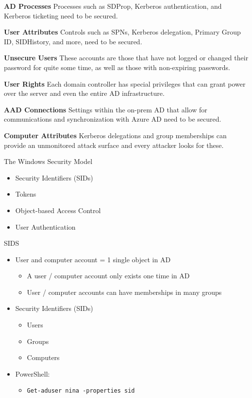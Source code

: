 \textbf{AD Processes}
Processes such as SDProp, Kerberos authentication, and Kerberos ticketing need to be secured.

\textbf{User Attributes}
Controls such as SPNs, Kerberos delegation, Primary Group ID, SIDHistory, and more, need to be secured.

\textbf{Unsecure Users}
These accounts are those that have not logged or changed their password for quite some time, as well as those with non-expiring passwords.

\textbf{User Rights}
Each domain controller has special privileges that can grant power over the server and even the entire AD infrastructure.

\textbf{AAD Connections}
Settings within the on-prem AD that allow for communications and synchronization with Azure AD need to be secured.

\textbf{Computer Attributes}
Kerberos delegations and group memberships can provide an unmonitored attack surface and every attacker looks for these.

The Windows Security Model

\begin{itemize}
    \item Security Identifiers (SIDs)
    \item Tokens
    \item Object-based Access Control
    \item User Authentication
\end{itemize}

SIDS
\begin{itemize}
    \item User and computer account = 1 single object in AD
    \begin{itemize}
        \item A user / computer account only exists one time in AD
        \item User / computer accounts can have memberships in many groups
    \end{itemize}
\item Security Identifiers (SIDs)
\begin{itemize}
    \item Users
    \item Groups
    \item Computers
\end{itemize}
\item PowerShell:
\begin{itemize}
    \item \texttt{Get-aduser nina -properties sid}

\end{itemize}
\end{itemize}

